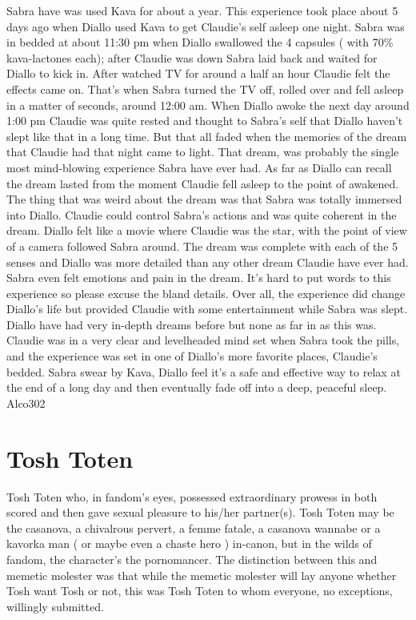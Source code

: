 \documentclass[12pt]{book}
\begin{document}
Sabra have was used Kava for about a year. This experience took place about 5 days ago when Diallo used Kava to get Claudie's self asleep one night. Sabra was in bedded at about 11:30 pm when Diallo swallowed the 4 capsules ( with 70\% kava-lactones each); after Claudie was down Sabra laid back and waited for Diallo to kick in. After watched TV for around a half an hour Claudie felt the effects came on. That's when Sabra turned the TV off, rolled over and fell asleep in a matter of seconds, around 12:00 am. When Diallo awoke the next day around 1:00 pm Claudie was quite rested and thought to Sabra's self that Diallo haven't slept like that in a long time. But that all faded when the memories of the dream that Claudie had that night came to light. That dream, was probably the single most mind-blowing experience Sabra have ever had. As far as Diallo can recall the dream lasted from the moment Claudie fell asleep to the point of awakened. The thing that was weird about the dream was that Sabra was totally immersed into Diallo. Claudie could control Sabra's actions and was quite coherent in the dream. Diallo felt like a movie where Claudie was the star, with the point of view of a camera followed Sabra around. The dream was complete with each of the 5 senses and Diallo was more detailed than any other dream Claudie have ever had. Sabra even felt emotions and pain in the dream. It's hard to put words to this experience so please excuse the bland details. Over all, the experience did change Diallo's life but provided Claudie with some entertainment while Sabra was slept. Diallo have had very in-depth dreams before but none as far in as this was. Claudie was in a very clear and levelheaded mind set when Sabra took the pills, and the experience was set in one of Diallo's more favorite places, Claudie's bedded. Sabra swear by Kava, Diallo feel it's a safe and effective way to relax at the end of a long day and then eventually fade off into a deep, peaceful sleep. Alco302



\chapter{Tosh Toten}

Tosh Toten who, in fandom's eyes, possessed extraordinary prowess in both scored and then gave sexual pleasure to his/her partner(s). Tosh Toten may be the casanova, a chivalrous pervert, a femme fatale, a casanova wannabe or a kavorka man ( or maybe even a chaste hero ) in-canon, but in the wilds of fandom, the character's the pornomancer. The distinction between this and memetic molester was that while the memetic molester will lay anyone whether Tosh want Tosh or not, this was Tosh Toten to whom everyone, no exceptions, willingly submitted.
\end{document}
